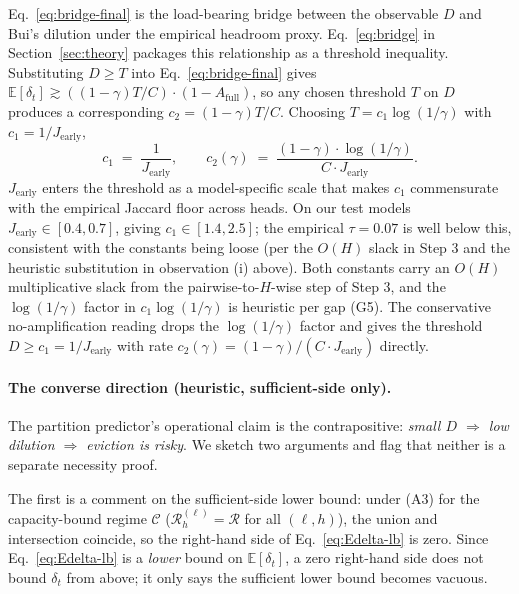 \documentclass{article}
\begin{document}
Eq.~\eqref{eq:bridge-final} is the load-bearing bridge between the
observable $D$ and Bui's dilution under the empirical headroom proxy.
Eq.~\eqref{eq:bridge} in Section~\ref{sec:theory} packages this
relationship as a threshold inequality. Substituting $D \geq T$ into
Eq.~\eqref{eq:bridge-final} gives $\mathbb{E}[\delta_t] \gtrsim
((1 - \gamma) T / C) \cdot (1 - A_{\mathrm{full}})$, so any chosen
threshold $T$ on $D$ produces a corresponding $c_2 = (1 - \gamma) T /
C$. Choosing $T = c_1 \log(1/\gamma)$ with $c_1 = 1/J_{\text{early}}$,
\begin{equation}
\label{eq:c1c2}
\boxed{
c_1 \;=\; \frac{1}{J_{\text{early}}}, \qquad
c_2(\gamma) \;=\; \frac{(1 - \gamma) \cdot \log(1/\gamma)}{C \cdot J_{\text{early}}}.
}
\end{equation}
$J_{\text{early}}$ enters the threshold as a model-specific scale that
makes $c_1$ commensurate with the empirical Jaccard floor across heads.
On our test models $J_{\text{early}} \in [0.4, 0.7]$, giving $c_1 \in
[1.4, 2.5]$; the empirical $\tau = 0.07$ is well below this, consistent
with the constants being loose (per the $O(H)$ slack in Step 3 and the
heuristic substitution in observation (i) above). Both constants carry
an $O(H)$ multiplicative slack from the pairwise-to-$H$-wise step of
Step 3, and the $\log(1/\gamma)$ factor in $c_1 \log(1/\gamma)$ is
heuristic per gap (G5). The conservative no-amplification reading drops
the $\log(1/\gamma)$ factor and gives the threshold $D \geq c_1 =
1/J_{\text{early}}$ with rate $c_2(\gamma) = (1 - \gamma)/(C \cdot
J_{\text{early}})$ directly.

\paragraph{The converse direction (heuristic, sufficient-side only).}
The partition predictor's operational claim is the contrapositive:
\emph{small $D$ $\Rightarrow$ low dilution $\Rightarrow$ eviction is
risky}. We sketch two arguments and flag that neither is a separate
necessity proof.

The first is a comment on the sufficient-side lower bound: under (A3)
for the capacity-bound regime $\mathcal{C}$ ($\mathcal{R}^{(\ell)}_h =
\mathcal{R}$ for all $(\ell, h)$), the union and intersection coincide,
so the right-hand side of Eq.~\eqref{eq:Edelta-lb} is zero. Since
Eq.~\eqref{eq:Edelta-lb} is a \emph{lower} bound on
$\mathbb{E}[\delta_t]$, a zero right-hand side does not bound
$\delta_t$ from above; it only says the sufficient lower bound becomes
vacuous.
\end{document}
